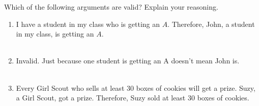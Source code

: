 \documentclass{amsart}
\theoremstyle{definition}
\theoremstyle{Exercise}
\theoremstyle{remark}
\theoremstyle{rule}
\numberwithin{equation}{section}
\begin{document}
 Which of the following arguments are valid? Explain your reasoning.\\
 \begin{enumerate}[label=(\alph*)]
\item I have a student in my class who is getting an $A$. Therefore, John, a student in my class, is getting an $A$. \\\\
\item Invalid. Just because one student is getting an A doesn’t mean John is.
\\\\
\item Every Girl Scout who sells at least 30 boxes of cookies will get a prize. Suzy, a Girl Scout, got a prize. Therefore, Suzy sold at least 30 boxes of cookies.\\\\
\\\\
 \end{enumerate}
\end{document}
